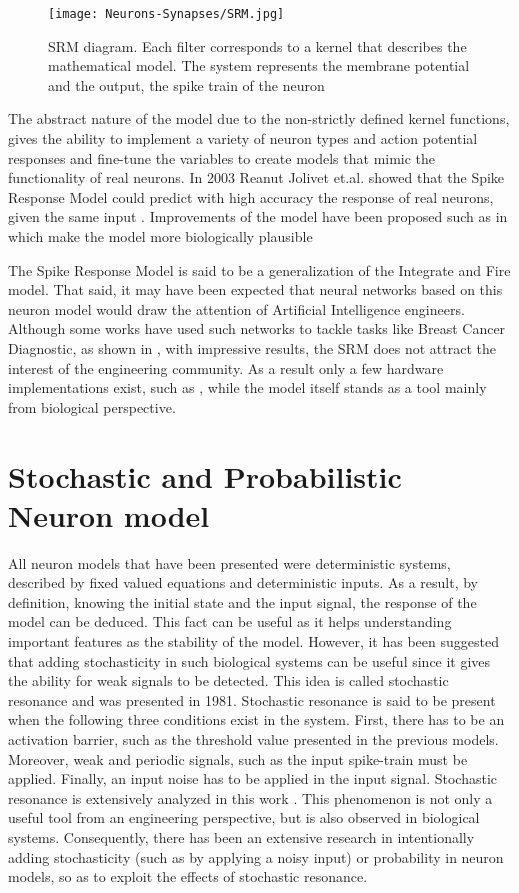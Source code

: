 \documentclass[12pt]{report}
\begin{document}
\begin{figure}[htp]
    \centering
    \texttt{[image: Neurons-Synapses/SRM.jpg]}
    \caption{SRM diagram. Each filter corresponds to a kernel that describes the mathematical model. The system represents the membrane potential and the output, the spike train of the neuron}
    \label{fig:lif-neuron}
\end{figure}

The abstract nature of the model due to the non-strictly defined kernel functions, gives the ability to implement a variety of neuron types and action potential responses and fine-tune the variables to create models that mimic the functionality of real neurons. In 2003 Reanut Jolivet et.al. showed that the Spike Response Model could predict with high accuracy the response of real neurons, given the same input \cite{Jolivet2003}. Improvements of the model have been proposed such as in \cite{Bohte2012} which make the model more biologically plausible

The Spike Response Model is said to be a generalization of the Integrate and Fire model. That said, it may have been expected that 
neural networks based on this neuron model would draw the attention of Artificial Intelligence engineers. Although some works have used such networks to tackle tasks like Breast Cancer Diagnostic, as shown in \cite{Ourdighi2016}, with impressive results, the SRM does not attract the interest of the engineering community. As a result only a few hardware implementations exist, such as \cite{Clayton2011}, while the model itself stands as a tool mainly from biological perspective.

\section{Stochastic and Probabilistic Neuron model}

All neuron models that have been presented were deterministic systems, described by fixed valued equations and deterministic inputs. As a result, by definition, knowing the initial state and the input signal, the response of the model can be deduced. This fact can be useful as it helps understanding important features as the stability of the model. However, it has been suggested that adding stochasticity in such biological systems can be useful since it gives the ability for weak signals to be detected. This idea is called stochastic resonance and was presented in 1981. Stochastic resonance is said to be present when the following three conditions exist in the system. First, there has to be an activation barrier, such as the threshold value presented in the previous models. Moreover, weak and periodic signals, such as the input spike-train must be applied. Finally, an input noise has to be applied in the input signal. Stochastic resonance is extensively analyzed in this work \cite{Gammaitoni1998}. This phenomenon is not only a useful tool from an engineering perspective, but is also observed in biological systems\cite{Honggi2002}. Consequently, there has been an extensive research in intentionally adding stochasticity (such as by applying a noisy input) or probability in neuron models, so as to exploit the effects of stochastic resonance.
\end{document}
